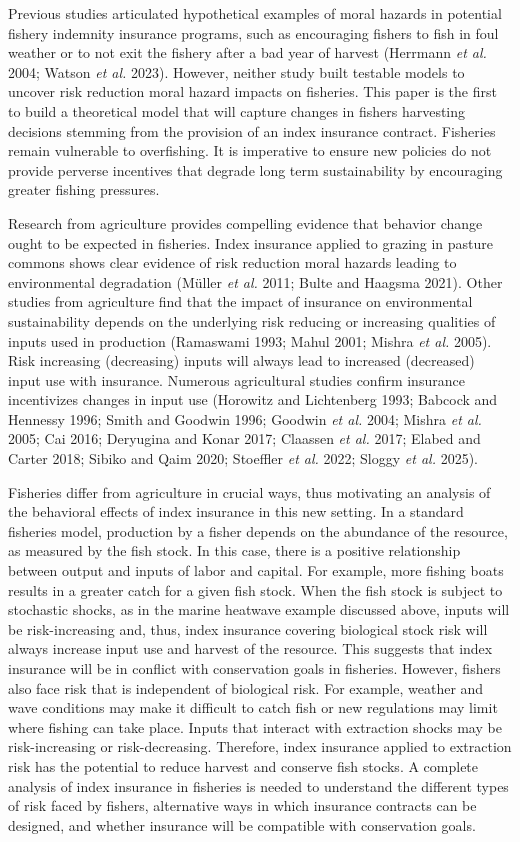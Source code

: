 \documentclass[
  letterpaper,
  DIV=11,
  numbers=noendperiod]{scrartcl}
\theoremstyle{plain}
\theoremstyle{plain}
\theoremstyle{remark}
\begin{document}
Previous studies articulated hypothetical examples of moral hazards in
potential fishery indemnity insurance programs, such as encouraging
fishers to fish in foul weather or to not exit the fishery after a bad
year of harvest (Herrmann \emph{et al.} 2004; Watson \emph{et al.}
2023). However, neither study built testable models to uncover risk
reduction moral hazard impacts on fisheries. This paper is the first to
build a theoretical model that will capture changes in fishers
harvesting decisions stemming from the provision of an index insurance
contract. Fisheries remain vulnerable to overfishing. It is imperative
to ensure new policies do not provide perverse incentives that degrade
long term sustainability by encouraging greater fishing pressures.

Research from agriculture provides compelling evidence that behavior
change ought to be expected in fisheries. Index insurance applied to
grazing in pasture commons shows clear evidence of risk reduction moral
hazards leading to environmental degradation (Müller \emph{et al.} 2011;
Bulte and Haagsma 2021). Other studies from agriculture find that the
impact of insurance on environmental sustainability depends on the
underlying risk reducing or increasing qualities of inputs used in
production (Ramaswami 1993; Mahul 2001; Mishra \emph{et al.} 2005). Risk
increasing (decreasing) inputs will always lead to increased (decreased)
input use with insurance. Numerous agricultural studies confirm
insurance incentivizes changes in input use (Horowitz and Lichtenberg
1993; Babcock and Hennessy 1996; Smith and Goodwin 1996; Goodwin
\emph{et al.} 2004; Mishra \emph{et al.} 2005; Cai 2016; Deryugina and
Konar 2017; Claassen \emph{et al.} 2017; Elabed and Carter 2018; Sibiko
and Qaim 2020; Stoeffler \emph{et al.} 2022; Sloggy \emph{et al.} 2025).

Fisheries differ from agriculture in crucial ways, thus motivating an
analysis of the behavioral effects of index insurance in this new
setting. In a standard fisheries model, production by a fisher depends
on the abundance of the resource, as measured by the fish stock. In this
case, there is a positive relationship between output and inputs of
labor and capital. For example, more fishing boats results in a greater
catch for a given fish stock. When the fish stock is subject to
stochastic shocks, as in the marine heatwave example discussed above,
inputs will be risk-increasing and, thus, index insurance covering
biological stock risk will always increase input use and harvest of the
resource. This suggests that index insurance will be in conflict with
conservation goals in fisheries. However, fishers also face risk that is
independent of biological risk. For example, weather and wave conditions
may make it difficult to catch fish or new regulations may limit where
fishing can take place. Inputs that interact with extraction shocks may
be risk-increasing or risk-decreasing. Therefore, index insurance
applied to extraction risk has the potential to reduce harvest and
conserve fish stocks. A complete analysis of index insurance in
fisheries is needed to understand the different types of risk faced by
fishers, alternative ways in which insurance contracts can be designed,
and whether insurance will be compatible with conservation goals.
\end{document}
